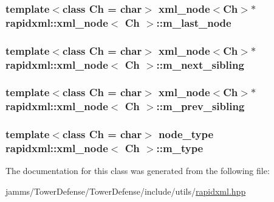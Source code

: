 \hypertarget{singletonrapidxml_1_1xml__node_adc211d26cfea2ba6fb51adb27694ff09}{
\subsubsection[{m\+\_\+last\+\_\+node}]{\setlength{\rightskip}{0pt plus 5cm}template$<$class Ch = char$>$ {\bf xml\+\_\+node}$<$Ch$>$$\ast$ {\bf rapidxml\+::xml\+\_\+node}$<$ Ch $>$\+::m\+\_\+last\+\_\+node\hspace{0.3cm}{\ttfamily [private]}}}\label{singletonrapidxml_1_1xml__node_adc211d26cfea2ba6fb51adb27694ff09}
\hypertarget{singletonrapidxml_1_1xml__node_a202e84dfdd34cb65557b64e31b7e205a}{
\subsubsection[{m\+\_\+next\+\_\+sibling}]{\setlength{\rightskip}{0pt plus 5cm}template$<$class Ch = char$>$ {\bf xml\+\_\+node}$<$Ch$>$$\ast$ {\bf rapidxml\+::xml\+\_\+node}$<$ Ch $>$\+::m\+\_\+next\+\_\+sibling\hspace{0.3cm}{\ttfamily [private]}}}\label{singletonrapidxml_1_1xml__node_a202e84dfdd34cb65557b64e31b7e205a}
\hypertarget{singletonrapidxml_1_1xml__node_a571f24c86107f8442f46a514a7cc5d0d}{
\subsubsection[{m\+\_\+prev\+\_\+sibling}]{\setlength{\rightskip}{0pt plus 5cm}template$<$class Ch = char$>$ {\bf xml\+\_\+node}$<$Ch$>$$\ast$ {\bf rapidxml\+::xml\+\_\+node}$<$ Ch $>$\+::m\+\_\+prev\+\_\+sibling\hspace{0.3cm}{\ttfamily [private]}}}\label{singletonrapidxml_1_1xml__node_a571f24c86107f8442f46a514a7cc5d0d}
\hypertarget{singletonrapidxml_1_1xml__node_a33912a5ceef221d662bbac67c70e1397}{
\subsubsection[{m\+\_\+type}]{\setlength{\rightskip}{0pt plus 5cm}template$<$class Ch = char$>$ {\bf node\+\_\+type} {\bf rapidxml\+::xml\+\_\+node}$<$ Ch $>$\+::m\+\_\+type\hspace{0.3cm}{\ttfamily [private]}}}\label{singletonrapidxml_1_1xml__node_a33912a5ceef221d662bbac67c70e1397}


The documentation for this class was generated from the following file\+:\begin{DoxyCompactItemize}
\item 
jamms/\+Tower\+Defense/\+Tower\+Defense/include/utils/\hyperlink{rapidxml_8hpp}{rapidxml.\+hpp}\end{DoxyCompactItemize}
